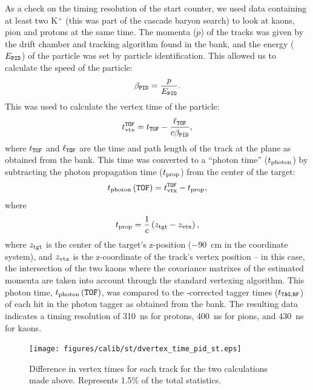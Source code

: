 \FloatBarrier

As a check on the timing resolution of the start counter, we used data containing at least two K$^+$ (this was part of the cascade baryon search) to look at kaons, pion and protons at the same time. The momenta ($p$) of the tracks was given by the drift chamber and tracking algorithm found in the  bank, and the energy ($E_{\mathtt{PID}}$) of the particle was set by particle identification. This allowed us to calculate the speed of the particle:
\begin{equation}
    \beta_{\mathtt{PID}} = \frac{p}{E_{\mathtt{PID}}}.
    \label{eqn:betapid}
\end{equation}
This was used to calculate the vertex time of the particle:
\begin{equation}
    t_{\mathrm{vtx}}^{\mathtt{TOF}} = t_{\mathtt{TOF}} - \frac{\ell_{\mathtt{TOF}}}{c\beta_{\mathtt{PID}}},
    \label{eqn:tvtofpid}
\end{equation}
where $t_{\mathtt{TOF}}$ and $\ell_{\mathtt{TOF}}$ are the time and path length of the track at the  plane as obtained from the  bank. This time was converted to a ``photon time'' ($t_\mathrm{photon}$) by subtracting the photon propagation time ($t_{\mathrm{prop}}$) from the center of the target:
\begin{equation}
    t_\mathrm{photon}\left(\mathtt{TOF}\right) = t_{\mathrm{vtx}}^{\mathtt{TOF}} - t_{\mathrm{prop}},
    \label{eqn:tphotofpid}
\end{equation}
where
\begin{equation}
    t_{\mathrm{prop}} = \frac{1}{c} \left( z_\mathrm{tgt} - z_\mathrm{vtx} \right),
\end{equation}
where $z_\mathrm{tgt}$ is the center of the target's z-position ($-90$~cm in the  coordinate system), and $z_\mathrm{vtx}$ is the z-coordinate of the track's vertex position -- in this case, the intersection of the two kaons where the covariance matrixes of the estimated momenta are taken into account through the standard  vertexing algorithm. This photon time, $t_\mathrm{photon}\left(\mathtt{TOF}\right)$, was compared to the -corrected tagger times ($t_{\mathtt{TAG},\mathtt{RF}}$) of each hit in the photon tagger as obtained from the  bank. The resulting data indicates a timing resolution of 310~ns for protons, 400~ns for pions, and 430~ns for kaons.

\begin{figure}[htbp]\begin{center}
\texttt{[image: figures/calib/st/dvertex\_time\_pid\_st.eps]}
\caption[vertex timing,  vs.\ ]{\label{fig:dvertex_time_pid_st}Difference in vertex times for each track for the two calculations made above. Represents 1.5\% of the total statistics.}
\end{center}\end{figure}

